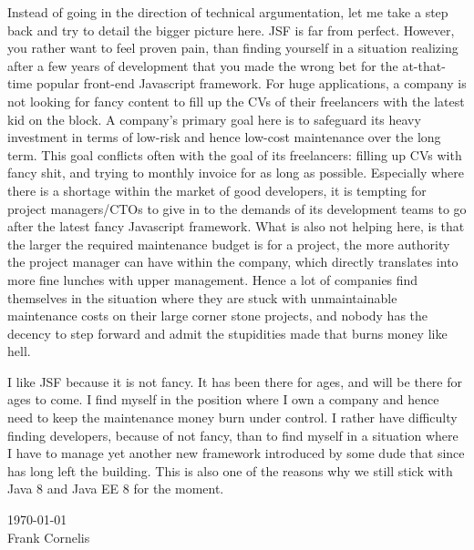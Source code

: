 Instead of going in the direction of technical argumentation, let me take a step back and try to detail the bigger picture here.
JSF is far from perfect.
However, you rather want to feel proven pain, than finding yourself in a situation realizing after a few years of development that you made the wrong bet for the at-that-time popular front-end Javascript framework.
For huge applications, a company is not looking for fancy content to fill up the CVs of their freelancers with the latest kid on the block.
A company's primary goal here is to safeguard its heavy investment in terms of low-risk and hence low-cost maintenance over the long term.
This goal conflicts often with the goal of its freelancers: filling up CVs with fancy shit, and trying to monthly invoice for as long as possible.
Especially where there is a shortage within the market of good developers,
it is tempting for project managers/CTOs to give in to the demands of its development teams to go after the latest fancy Javascript framework.
What is also not helping here, is that the larger the required maintenance budget is for a project,
the more authority the project manager can have within the company,
which directly translates into more fine lunches with upper management.
Hence a lot of companies find themselves in the situation where they are stuck with unmaintainable maintenance costs on their large corner stone projects, and nobody has the decency to step forward and admit the stupidities made that burns money like hell.

I like JSF because it is not fancy.
It has been there for ages, and will be there for ages to come.
I find myself in the position where I own a company and hence need to keep the maintenance money burn under control.
I rather have difficulty finding developers, because of not fancy, than to find myself in a situation where I have to manage yet another new framework introduced by some dude that since has long left the building.
This is also one of the reasons why we still stick with Java 8 \cite{GoslingJoyEtAl14} and Java EE 8 \cite{JavaEE8} for the moment.
 \begin{flushright}
\today \\
Frank Cornelis 
\end{flushright}
